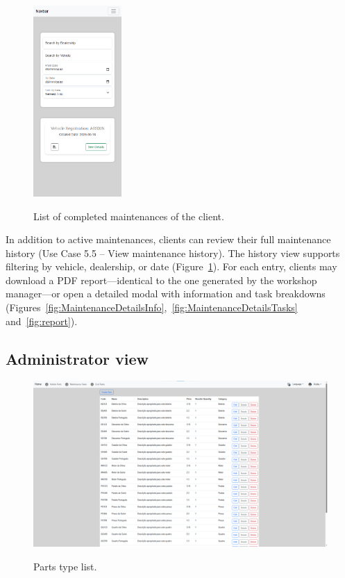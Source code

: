 \begin{figure}[h]
  \caption{List of completed maintenances of the client.}
  \centering
  \includegraphics[width=0.30\textwidth]{figs/Implementation/client/MaintenanceHistory}
  \label{fig:clientMaintenanceHistory}
\end{figure}


In addition to active maintenances, clients can review their full maintenance history (Use Case 5.5 – View maintenance history). The history view supports filtering by vehicle, dealership, or date (Figure~\ref{fig:clientMaintenanceHistory}). For each entry, clients may download a PDF report—identical to the one generated by the workshop manager—or open a detailed modal with information and task breakdowns (Figures~\ref{fig:MaintenanceDetailsInfo},~\ref{fig:MaintenanceDetailsTasks} and~\ref{fig:report}).



\subsection{Administrator view}


\begin{figure}[h]
  \caption{Parts type list.}
  \centering
  \includegraphics[width=\textwidth]{figs/Implementation/dealershipAdmin/partsIndex}
  \label{fig:partsIndex}
\end{figure}



